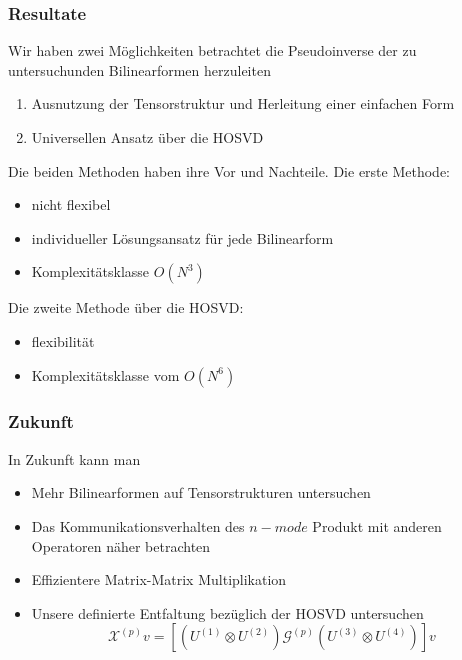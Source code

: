 \begin{frame}
\frametitle{Resultate}
Wir haben zwei Möglichkeiten betrachtet die Pseudoinverse der zu untersuchunden Bilinearformen herzuleiten
\begin{enumerate}
\item Ausnutzung der Tensorstruktur und Herleitung einer einfachen Form
\item Universellen Ansatz über die HOSVD
\end{enumerate}
Die beiden Methoden haben ihre Vor und Nachteile. Die erste Methode:
\begin{itemize}
\item nicht flexibel
\item individueller Lösungsansatz für jede Bilinearform
\item Komplexitätsklasse $O(N^3)$
\end{itemize}
Die zweite Methode über die HOSVD:
\begin{itemize}
\item flexibilität
\item Komplexitätsklasse vom $O(N^6)$
\end{itemize}
\end{frame}
\begin{frame}
\frametitle{Zukunft}
In Zukunft kann man 
\begin{itemize}
\item Mehr Bilinearformen auf Tensorstrukturen untersuchen
\item Das Kommunikationsverhalten des $n-mode$ Produkt  mit anderen Operatoren näher betrachten
\item Effizientere Matrix-Matrix Multiplikation
\item Unsere definierte Entfaltung bezüglich der HOSVD untersuchen
\begin{equation*}
\mathcal{X}^{(p)} v = [(U^{(1)} \otimes U^{(2)}) \mathcal{G}^{(p)} (U^{(3)} \otimes U^{(4)})] v
\end{equation*}
\end{itemize}
\end{frame}